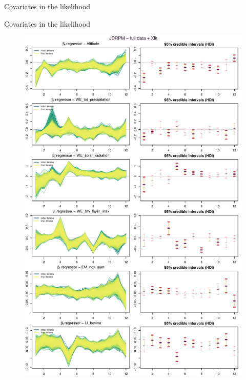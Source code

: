 \documentclass[
	11pt, %
 xcolor={dvipsnames,svgnames}
]{beamer}
\begin{document}
\begin{frame}{Covariates in the likelihood}
\begin{figure}[!ht]
    \label{fig: all NA fitted values tests}
\end{figure}
\end{frame}

\begin{frame}{Covariates in the likelihood}
\begin{figure}[!p]
    \centering
    \includegraphics[clip, trim=0px 25.97cm 0px 15px, width=1\linewidth]{Testing/Covariates/better likelihood plots/up_LINES_beta_TR_plus_CIJDRPM - full data + Xlk.pdf}\\

\end{figure}
\end{frame}
\end{document}
